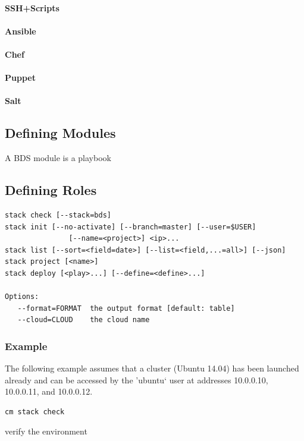 \paragraph{SSH+Scripts}
\paragraph{Ansible}
\paragraph{Chef}
\paragraph{Puppet}
\paragraph{Salt}

\subsection{Defining Modules}
A BDS module is a playbook 

\subsection{Defining Roles}

\begin{Verbatim}[fontfamily=helvetica]
stack check [--stack=bds]
stack init [--no-activate] [--branch=master] [--user=$USER] 
               [--name=<project>] <ip>...
stack list [--sort=<field=date>] [--list=<field,...=all>] [--json]
stack project [<name>]
stack deploy [<play>...] [--define=<define>...]

Options:
   --format=FORMAT  the output format [default: table]
   --cloud=CLOUD    the cloud name
\end{Verbatim}

\subsubsection{Example}

The following example assumes that a cluster (Ubuntu
14.04) has been launched already and can be accessed by
the 'ubuntu` user at addresses 10.0.0.10, 10.0.0.11, and
10.0.0.12.


\begin{Verbatim}[fontfamily=helvetica]
cm stack check
\end{Verbatim}
verify the environment


